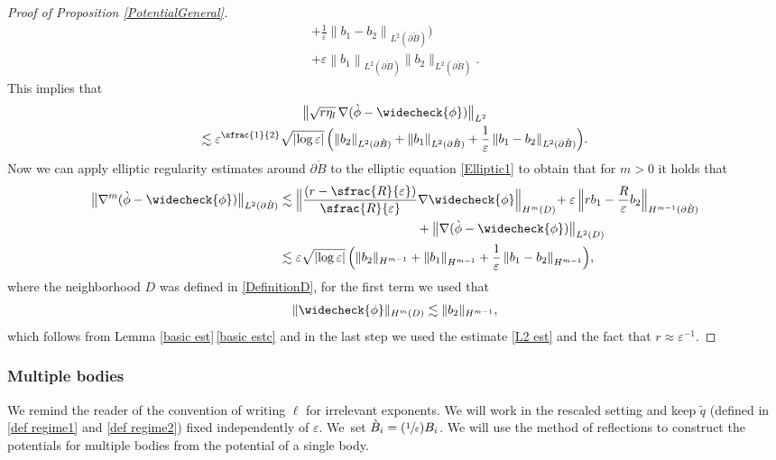 \documentclass[JEP,XML,SOM,Unicode,published]{cedram}
\let\epsilon\varepsilon
\newcommand{\Psfrac}[2]{(\sfrac{#1}{#2})}
\theoremstyle{definition}
\newcommand\norm[1]{\left\lVert #1\right\rVert}
\newcommand\anorm[1]{\lVert #1\rVert}
\newcommand\bnorm[1]{\bigl\lVert #1\bigr\rVert}
\newcommand\Bnorm[1]{\Bigl\lVert #1\Bigr\rVert}
\let\chek\widecheck
\let\de\partial
\let\eps\epsilon
\begin{document}
\begin{proof}[Proof of Proposition \ref{PotentialGeneral}]
\begin{multline*}
{+\frac{1}{\eps}\norm{b_1-b_2}_{L^2(\de\grave{B})}\Bigr)}\\
+\eps\norm{b_1}_{L^2(\de \grave{B})}\anorm{b_2}_{L^2(\de\grave{B})}.
\end{multline*}
This implies that
\begin{multline}
\bnorm{\sqrt{r\eta_l}\,\nabla(\grave{\phi}-\chek{\phi})}_{L^2}\\
\lesssim \eps^{\sfrac{1}{2}}\sqrt{|{\log\eps}|}\,\Bigl(\anorm{b_2}_{L^2(\de\grave{B})}+\norm{b_1}_{L^2(\de\grave{B})}+\frac{1}{\eps}\norm{b_1-b_2}_{L^2(\de\grave{B})}\Bigr).\label{L2 est}
\end{multline}
Now we can apply elliptic regularity estimates around $\de \grave{B}$ to the elliptic equation \eqref{Elliptic1} to obtain that for $m>0$ it holds that
\begin{align*}
\bnorm{\nabla^m(\grave{\phi}-\chek{\phi})}_{L^2(\de\grave{B})}&\lesssim \Bnorm{\frac{(r-\sfrac{R}{\eps})}{\sfrac{R}{\eps}}\nabla\chek{\phi}}_{H^{m}(D)}\!+\eps\,\Bnorm{rb_1-\frac{R}{\eps}b_2}_{H^{m-1}(\de \grave{B})}\\
&\hspace*{3.83cm}
+\bnorm{\nabla(\grave{\phi}-\chek{\phi})}_{L^2(D)}\\
&\lesssim \eps\sqrt{|{\log\eps}|}\,\Bigl(\anorm{b_2}_{H^{m-1}}+\norm{b_1}_{H^{m-1}}+\frac{1}{\eps}\norm{b_1-b_2}_{H^{m-1}}\Bigr),
\end{align*}
where the neighborhood $D$ was defined in \eqref{DefinitionD}, for the first term we used that
\begin{align*}\anorm{\chek{\phi}}_{H^m(D)}\lesssim \anorm{b_2}_{H^{m-1}},
\end{align*}
which follows from Lemma \ref{basic est}\,\eqref{basic estc} and in the last step we used the estimate \eqref{L2 est} and the fact that $r\approx \eps^{-1}$.
\end{proof}

\subsubsection{Multiple bodies}\label{subsec mult bod}

We remind the reader of the convention of writing $\ell$ for irrelevant exponents.
We will work in the rescaled setting and keep $\tilde{q}$ (defined in \eqref{def regime1} and \eqref{def regime2}) fixed independently of $\eps$. We~set $\grave{B}_i=\Psfrac{1}{\eps}B_i$.
We will use the method of reflections to construct the potentials for multiple bodies from the potential of a single body.
\end{document}
